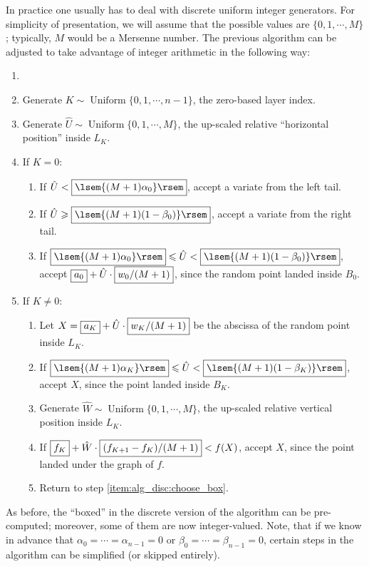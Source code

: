 \documentclass{article}
\renewcommand{\geq}{\geqslant}
\renewcommand{\leq}{\leqslant}
\theoremstyle{definition} %
\newenvironment{algorithm}[1]
  {\renewcommand\theAUXalgorithm{#1}\AUXalgorithm\begin{enumerate}\item[]}
  {\end{enumerate}\endAUXalgorithm}
\DeclareMathOperator{\DUnif}{\mathrm{Uniform}} %
\newcommand{\nolabel}[1]{}
\newcommand{\cache}[1]{\fbox{$#1$}}
\newcommand{\round}[1]{\lsem{#1}\rsem}
\begin{document}
In practice one usually has to deal with discrete uniform integer generators. For simplicity of presentation, we will assume that the possible values are $\{ 0, 1, \cdots , M \}$; typically, $M$ would be a Mersenne number.
The previous algorithm can be adjusted to take advantage of integer arithmetic in the following way:
\begin{algorithm}{(Discrete uniform integer generators)}
    \item \label{item:alg_disc:choose_box} Generate $K \sim \DUnif \{ 0, 1, \cdots , n - 1 \}$, the zero-based layer index.

    \item \nolabel{item:alg_disc:horizontal} Generate $\hat{U} \sim \DUnif \{ 0, 1, \cdots , M \}$, the up-scaled relative ``horizontal position'' inside $L_K$.

    \item \nolabel{item:alg_disc:bottom_layer} If $K = 0$:
        \begin{enumerate}
            \item If $\hat{U} < \cache{\round{(M + 1) \alpha _0}}$, accept a variate from the left tail.
            \item If $\hat{U} \geq \cache{\round{(M + 1) (1 - \beta _0)}}$, accept a variate from the right tail.
            \item If $\cache{\round{(M + 1) \alpha _0}} \leq \hat{U} < \cache{\round{(M + 1) (1 - \beta _0)}}$, accept $\cache{a_0} + \hat{U} \cdot \cache{w_0  / (M + 1)}$, since the random point landed inside $B_0$.
        \end{enumerate}

    \item \nolabel{item:alg_disc:other_layers} If $K \neq 0$:
        \begin{enumerate}
            \item Let $X = \cache{a_K} + \hat{U} \cdot \cache{w_K / (M + 1)}$ be the abscissa of the random point inside $L_K$.
            \item If $\cache{\round{(M + 1) \alpha _K}} \leq \hat{U} < \cache{\round{(M + 1) (1 - \beta _K)}}$, accept $X$, since the point landed inside $B_K$.
            \item Generate $\hat{W} \sim \DUnif \{0, 1, \cdots , M \}$, the up-scaled relative vertical position inside $L_K$.
            \item If $\cache{f_K} + \hat{W} \cdot \cache{(f_{K + 1} - f_{K}) / (M + 1)} < f(X)$, accept $X$, since the point landed under the graph of $f$.
            \item Return to step \ref{item:alg_disc:choose_box}.
        \end{enumerate}
\end{algorithm}
%
As before, the ``boxed''  in the discrete version of the algorithm can be pre-computed; moreover, some of them are now integer-valued. Note, that if we know in advance that $\alpha _0 = \cdots = \alpha _{n - 1} = 0$ or $\beta _0 = \cdots = \beta _{n - 1} = 0$, certain steps in the algorithm can be simplified (or skipped entirely).
\end{document}

